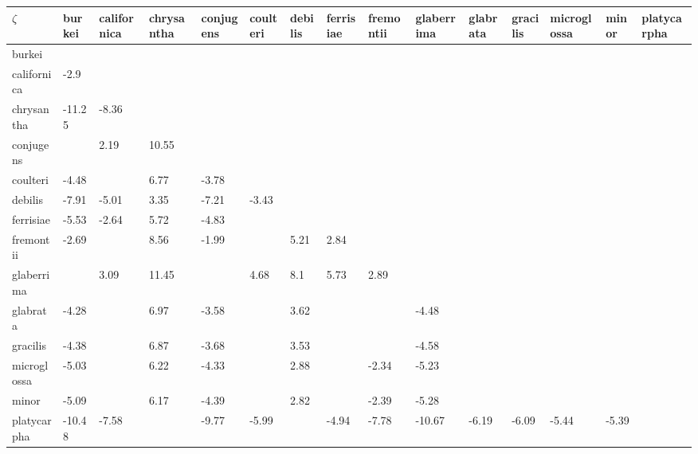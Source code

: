 \begin{table}[ht]
\centering
\begingroup\fontsize{5pt}{5pt}\selectfont
\begin{tabular}{lllllllllllllll}
  \hline
$\zeta$ & burkei & californica & chrysantha & conjugens & coulteri & debilis & ferrisiae & fremontii & glaberrima & glabrata & gracilis & microglossa & minor & platycarpha \\ 
  \hline
burkei &  &  &  &  &  &  &  &  &  &  &  &  &  &  \\ 
  californica & -2.9 &  &  &  &  &  &  &  &  &  &  &  &  &  \\ 
  chrysantha & -11.25 & -8.36 &  &  &  &  &  &  &  &  &  &  &  &  \\ 
  conjugens &  & 2.19 & 10.55 &  &  &  &  &  &  &  &  &  &  &  \\ 
  coulteri & -4.48 &  & 6.77 & -3.78 &  &  &  &  &  &  &  &  &  &  \\ 
  debilis & -7.91 & -5.01 & 3.35 & -7.21 & -3.43 &  &  &  &  &  &  &  &  &  \\ 
  ferrisiae & -5.53 & -2.64 & 5.72 & -4.83 &  &  &  &  &  &  &  &  &  &  \\ 
  fremontii & -2.69 &  & 8.56 & -1.99 &  & 5.21 & 2.84 &  &  &  &  &  &  &  \\ 
  glaberrima &  & 3.09 & 11.45 &  & 4.68 & 8.1 & 5.73 & 2.89 &  &  &  &  &  &  \\ 
  glabrata & -4.28 &  & 6.97 & -3.58 &  & 3.62 &  &  & -4.48 &  &  &  &  &  \\ 
  gracilis & -4.38 &  & 6.87 & -3.68 &  & 3.53 &  &  & -4.58 &  &  &  &  &  \\ 
  microglossa & -5.03 &  & 6.22 & -4.33 &  & 2.88 &  & -2.34 & -5.23 &  &  &  &  &  \\ 
  minor & -5.09 &  & 6.17 & -4.39 &  & 2.82 &  & -2.39 & -5.28 &  &  &  &  &  \\ 
  platycarpha & -10.48 & -7.58 &  & -9.77 & -5.99 &  & -4.94 & -7.78 & -10.67 & -6.19 & -6.09 & -5.44 & -5.39 &  \\ 
   \hline
\end{tabular}
\endgroup
\end{table}
